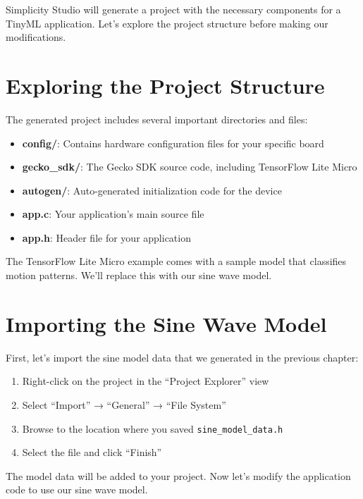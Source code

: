 \documentclass[
  9pt,
  letterpaper,
  abstract,
  titlepage]{scrbook}
\providecommand{\tightlist}{%
  \setlength{\itemsep}{0pt}\setlength{\parskip}{0pt}}\usepackage{longtable,booktabs,array}
\def\tightlist{}
\let\tightlist\relax
\begin{document}
Simplicity Studio will generate a project with the necessary components
for a TinyML application. Let's explore the project structure before
making our modifications.

\section{Exploring the Project
Structure}\label{exploring-the-project-structure}

The generated project includes several important directories and files:

\begin{itemize}
\tightlist
\item
  \textbf{config/}: Contains hardware configuration files for your
  specific board
\item
  \textbf{gecko\_sdk/}: The Gecko SDK source code, including TensorFlow
  Lite Micro
\item
  \textbf{autogen/}: Auto-generated initialization code for the device
\item
  \textbf{app.c}: Your application's main source file
\item
  \textbf{app.h}: Header file for your application
\end{itemize}

The TensorFlow Lite Micro example comes with a sample model that
classifies motion patterns. We'll replace this with our sine wave model.

\section{Importing the Sine Wave
Model}\label{importing-the-sine-wave-model}

First, let's import the sine model data that we generated in the
previous chapter:

\begin{enumerate}
\def\labelenumi{\arabic{enumi}.}
\tightlist
\item
  Right-click on the project in the ``Project Explorer'' view
\item
  Select ``Import'' → ``General'' → ``File System''
\item
  Browse to the location where you saved \texttt{sine\_model\_data.h}
\item
  Select the file and click ``Finish''
\end{enumerate}

The model data will be added to your project. Now let's modify the
application code to use our sine wave model.
\end{document}
